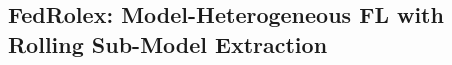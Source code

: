 \documentclass{article}
\begin{document}


\subsection{FedRolex: Model-Heterogeneous FL with Rolling Sub-Model Extraction}
%
\end{document}
